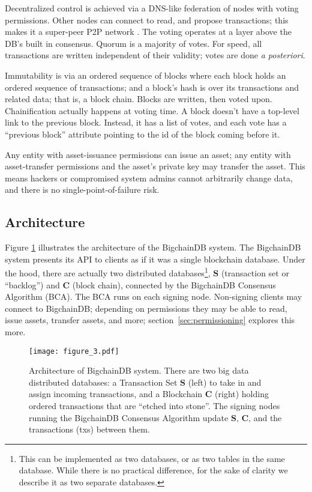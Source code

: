 Decentralized control is achieved via a DNS-like federation of nodes with voting permissions.
Other nodes can connect to read, and propose transactions; this makes it a super-peer P2P network \cite{ozsu2011principles}.
The voting operates at a layer above the DB’s built in consensus.
Quorum is a majority of votes.
For speed, all transactions are written independent of their validity; votes are done \textit{a posteriori}.

Immutability is via an ordered sequence of blocks where each block holds an ordered sequence of transactions; and a block’s hash is over its transactions and related data; that is, a block chain.
Blocks are written, then voted upon.
Chainification actually happens at voting time.
A block doesn't have a top-level link to the previous block.
Instead, it has a list of votes, and each vote has a “previous block” attribute pointing to the id of the block coming before it.

Any entity with asset-issuance permissions can issue an asset; any entity with asset-transfer permissions and the asset’s private key may transfer the asset.
This means hackers or compromised system admins cannot arbitrarily change data, and there is no single-point-of-failure risk.

\subsection{Architecture}
Figure \ref{fig:bigchaindb_architecture} illustrates the architecture of the BigchainDB system.
The BigchainDB system presents its API to clients as if it was a single blockchain database.
Under the hood, there are actually two distributed databases\footnote{This can be implemented as two databases, or as two tables in the same database. While there is no practical difference, for the sake of clarity we describe it as two separate databases.}, $\mathbf{S}$ (transaction set or “backlog”) and $\mathbf{C}$ (block chain), connected by the BigchainDB Consensus Algorithm (BCA).
The BCA runs on each signing node.
Non-signing clients may connect to BigchainDB; depending on permissions they may be able to read, issue assets, transfer assets, and more; section~\ref{sec:permissioning} explores this more.

\begin{figure}[!ht]
  \centering
  \texttt{[image: figure\_3.pdf]}
  \caption{Architecture of BigchainDB system.
  There are two big data distributed databases: a Transaction Set $\mathbf{S}$ (left) to take in and assign incoming transactions, and a Blockchain $\mathbf{C}$ (right) holding ordered transactions that are “etched into stone”.
  The signing nodes running the BigchainDB Consensus Algorithm update $\mathbf{S}$, $\mathbf{C}$, and the transactions (txs) between them.}
  \label{fig:bigchaindb_architecture}
\end{figure}

